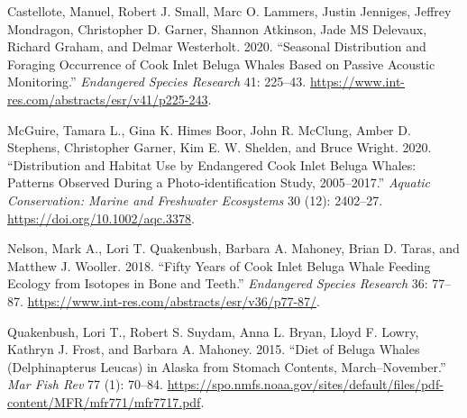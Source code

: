 \documentclass[
]{article}
\newlength{\cslhangindent}
\newlength{\cslentryspacingunit} %
\newenvironment{CSLReferences}[2] %
 {%
  \setlength{\parindent}{0pt}
  \ifodd #1
  \let\oldpar\par
  \def\par{\hangindent=\cslhangindent\oldpar}
  \fi
  \setlength{\parskip}{#2\cslentryspacingunit}
 }%
 {}
\begin{document}
\hypertarget{refs}{}
\begin{CSLReferences}{1}{0}
\leavevmode{}%
Castellote, Manuel, Robert J. Small, Marc O. Lammers, Justin Jenniges,
Jeffrey Mondragon, Christopher D. Garner, Shannon Atkinson, Jade MS
Delevaux, Richard Graham, and Delmar Westerholt. 2020. {``Seasonal
Distribution and Foraging Occurrence of Cook Inlet Beluga Whales Based
on Passive Acoustic Monitoring.''} \emph{Endangered Species Research}
41: 225--43. \url{https://www.int-res.com/abstracts/esr/v41/p225-243}.

\leavevmode{}%
McGuire, Tamara L., Gina K. Himes Boor, John R. McClung, Amber D.
Stephens, Christopher Garner, Kim E. W. Shelden, and Bruce Wright. 2020.
{``Distribution and Habitat Use by Endangered Cook Inlet Beluga Whales:
Patterns Observed During a Photo‐identification Study, 2005--2017.''}
\emph{Aquatic Conservation: Marine and Freshwater Ecosystems} 30 (12):
2402--27. \url{https://doi.org/10.1002/aqc.3378}.

\leavevmode{}%
Nelson, Mark A., Lori T. Quakenbush, Barbara A. Mahoney, Brian D. Taras,
and Matthew J. Wooller. 2018. {``Fifty Years of Cook Inlet Beluga Whale
Feeding Ecology from Isotopes in Bone and Teeth.''} \emph{Endangered
Species Research} 36: 77--87.
\url{https://www.int-res.com/abstracts/esr/v36/p77-87/}.

\leavevmode{}%
Quakenbush, Lori T., Robert S. Suydam, Anna L. Bryan, Lloyd F. Lowry,
Kathryn J. Frost, and Barbara A. Mahoney. 2015. {``Diet of Beluga Whales
(Delphinapterus Leucas) in Alaska from Stomach Contents,
March--November.''} \emph{Mar Fish Rev} 77 (1): 70--84.
\url{https://spo.nmfs.noaa.gov/sites/default/files/pdf-content/MFR/mfr771/mfr7717.pdf}.

\end{CSLReferences}
\end{document}
